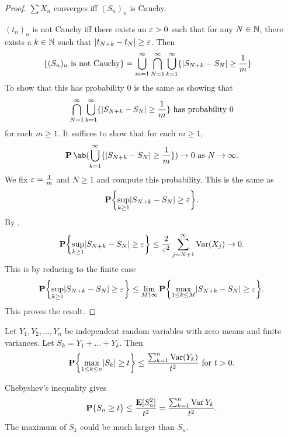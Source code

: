 \begin{proof}
    $\sum X_n$ converges iff $(S_n)_n$ is Cauchy.

    $(t_n)_n$ is not Cauchy iff there exists an $\varepsilon > 0$ such that
    for any $N \in \mathbb{N}$, there exists a $k \in \mathbb{N}$ such that
    $\lvert t_{N+k} - t_N\rvert \ge \varepsilon$.
    Then \begin{align*}
        \{(S_n)_n \text{ is not Cauchy}\}
        &= \bigcup_{m=1}^\infty \bigcap_{N=1}^\infty \bigcup_{k=1}^\infty
            \{\lvert S_{N+k} - S_N\rvert \ge \frac1m\}
    \end{align*}
    To show that this has probability $0$ is the same as showing that
    \[
        \bigcap_{N=1}^\infty \bigcup_{k=1}^\infty
        \{\lvert S_{N+k} - S_N\rvert \ge \frac1m\}
        \text{ has probability } 0
    \] for each $m \ge 1$.
    It suffices to show that for each $m \ge 1$, \[
        \P\ab(\bigcup_{k=1}^\infty \set{\abs{S_{N+k} - S_N} \ge \frac1m})
        \to 0 \text{ as } N \to \infty.
    \] We fix $\varepsilon = \frac1m$ and $N \ge 1$ and compute this probability.
    This is the same as \[
        \P\set*{\sup_{k \ge 1} \abs{S_{N+k} - S_N} \ge \eps}.
    \]
    By , \[
        \P\set*{\sup_{k \ge 1} \abs{S_{N+k} - S_N} \ge \eps}
        \le \frac 2{\eps^2} \sum_{j=N+1}^\infty \Var(X_j) \to 0.
    \] This is by reducing to the finite case \[
        \P\set*{\sup_{k\ge 1} \abs{S_{N+k} - S_N} \ge \eps}
        \le \lim_{M \upto \infty}
            \P\set*{\max_{1 \le k \le M} \abs{S_{N+k} - S_N} \ge \eps}.
    \]
    This proves the result.
\end{proof}

\begin{theorem} \label{thm:ris:max}
    Let $Y_1, Y_2, \dots, Y_n$ be independent random variables with
    zero means and finite variances.
    Let $S_k = Y_1 + \dots + Y_k$.
    Then \[
        \P\set*{\max_{1 \le k \le n} \abs{S_k} \ge t}
        \le \frac{\sum_{k=1}^n \Var(Y_k)}{t^2}
        \text{ for } t > 0.
    \]
\end{theorem}
Chebyshev's inequality gives \[
    \operatorname{\mathbf P}\{S_n \ge t\} \le \frac{\operatorname{\mathbf E}[S_n^2]}{t^2}
        = \frac{\sum_{k=1}^n \operatorname{Var} Y_k}{t^2}.
\] The maximum of $S_k$ could be much larger than $S_n$.
